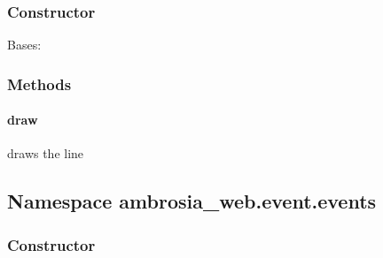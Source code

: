 \documentclass[letterpaper,10pt,english]{sphinxmanual}
\begin{document}
\subsubsection{Constructor}
\label{ambrosia_web.event.LineEvent:constructor}

\begin{fulllineitems}
\label{ambrosia_web.event.LineEvent:ambrosia_web.event.LineEvent}
Bases: {\hyperref[ambrosia_web.event.Event:ambrosia_web.event.Event]{}}

\end{fulllineitems}



\subsubsection{Methods}
\label{ambrosia_web.event.LineEvent:methods}

\paragraph{draw}
\label{ambrosia_web.event.LineEvent:draw}

\begin{fulllineitems}
\label{ambrosia_web.event.LineEvent:ambrosia_web.event.LineEvent.draw}
\end{fulllineitems}


draws the line


\subsection{Namespace ambrosia\_web.event.events}
\label{ambrosia_web.event.events:namespace-ambrosia-web-event-events}\label{ambrosia_web.event.events::doc}

\subsubsection{Constructor}
\label{ambrosia_web.event.events:constructor}

\begin{fulllineitems}
\label{ambrosia_web.event.events:ambrosia_web.event.events}
\end{fulllineitems}
\end{document}
